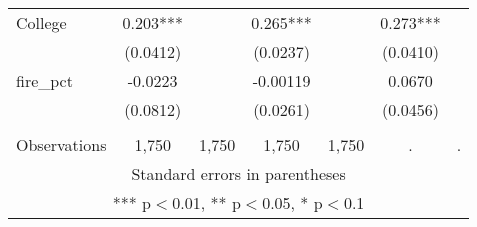 \begin{tabular}{lcccccc}
College & 0.203*** &  & 0.265*** &  & 0.273*** &  \\
 & (0.0412) &  & (0.0237) &  & (0.0410) &  \\
fire\_pct & -0.0223 &  & -0.00119 &  & 0.0670 &  \\
 & (0.0812) &  & (0.0261) &  & (0.0456) &  \\
 &  &  &  &  &  &  \\
 Observations & 1,750 & 1,750 & 1,750 & 1,750 & . & . \\ \hline
\multicolumn{7}{c}{ Standard errors in parentheses} \\
\multicolumn{7}{c}{ *** p$<$0.01, ** p$<$0.05, * p$<$0.1} \\
\end{tabular}
